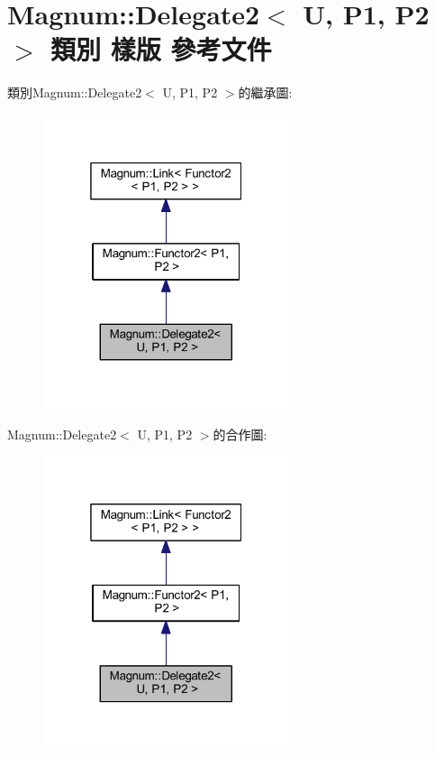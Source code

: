 \hypertarget{class_magnum_1_1_delegate2}{}\section{Magnum\+:\+:Delegate2$<$ U, P1, P2 $>$ 類別 樣版 參考文件}
\label{class_magnum_1_1_delegate2}


類別\+Magnum\+:\+:Delegate2$<$ U, P1, P2 $>$的繼承圖\+:\nopagebreak
\begin{figure}[H]
\begin{center}
\leavevmode
\includegraphics[width=205pt]{class_magnum_1_1_delegate2__inherit__graph}
\end{center}
\end{figure}


Magnum\+:\+:Delegate2$<$ U, P1, P2 $>$的合作圖\+:\nopagebreak
\begin{figure}[H]
\begin{center}
\leavevmode
\includegraphics[width=205pt]{class_magnum_1_1_delegate2__coll__graph}
\end{center}
\end{figure}
